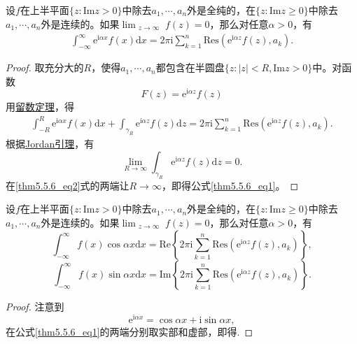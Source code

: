 \documentclass[../../main.tex]{subfiles}%
\begin{document}
\begin{theorem}\label{theorem:定理5.5.6}
设$f$在上半平面$\{ z: \mathrm{Im} z > 0 \}$中除去$a_1, \cdots, a_n$外是全纯的，在$\{ z: \mathrm{Im} z \geqslant 0 \}$中除去$a_1, \cdots, a_n$外是连续的。如果$\lim_{\substack{z \to \infty}} f(z) = 0$，那么对任意$\alpha > 0$，有
\begin{align}
\int_{-\infty}^{\infty} \mathrm{e}^{\mathrm{i}\alpha x} f(x) \mathrm{d}x = 2\pi \mathrm{i} \sum_{k=1}^{n} \mathrm{Res}(\mathrm{e}^{\mathrm{i}\alpha z} f(z), a_k). \label{thm5.5.6_eq1}
\end{align}
\end{theorem}
\begin{proof}
取充分大的$R$，使得$a_1, \cdots, a_n$都包含在半圆盘$\{ z: |z| < R, \mathrm{Im} z > 0 \}$中。对函数
\[
F(z) = \mathrm{e}^{\mathrm{i}\alpha z} f(z)
\]
用\hyperref[theorem:留数定理(残数定理)-定理5.4.9]{留数定理}，得
\begin{align}
\int_{-R}^{R} \mathrm{e}^{\mathrm{i}\alpha x} f(x) \mathrm{d}x + \int_{\gamma_R} \mathrm{e}^{\mathrm{i}\alpha z} f(z) \mathrm{d}z = 2\pi \mathrm{i} \sum_{k=1}^{n} \mathrm{Res}(\mathrm{e}^{\mathrm{i}\alpha z} f(z), a_k). \label{thm5.5.6_eq2}
\end{align}
根据\hyperref[lemma:Jordan引理]{Jordan引理}，有
\[
\lim_{R \to \infty} \int_{\gamma_R} \mathrm{e}^{\mathrm{i}\alpha z} f(z) \mathrm{d}z = 0.
\]
在\eqref{thm5.5.6_eq2}式的两端让$R \to \infty$，即得公式\eqref{thm5.5.6_eq1}。
\end{proof}

\begin{corollary}\label{corollary:推论5.5.7}
设$f$在上半平面$\{ z: \mathrm{Im} z > 0 \}$中除去$a_1, \cdots, a_n$外是全纯的，在$\{ z: \mathrm{Im} z \geqslant 0 \}$中除去$a_1, \cdots, a_n$外是连续的。如果$\lim_{\substack{z \to \infty}} f(z) = 0$，那么对任意$\alpha > 0$，有
\[
\int_{-\infty}^{\infty} f(x) \cos\alpha x \mathrm{d}x = \mathrm{Re} \left\{ 2\pi \mathrm{i} \sum_{k=1}^{n} \mathrm{Res}(\mathrm{e}^{\mathrm{i}\alpha z} f(z), a_k) \right\},
\]
\[
\int_{-\infty}^{\infty} f(x) \sin\alpha x \mathrm{d}x = \mathrm{Im} \left\{ 2\pi \mathrm{i} \sum_{k=1}^{n} \mathrm{Res}(\mathrm{e}^{\mathrm{i}\alpha z} f(z), a_k) \right\}.
\]
\end{corollary}
\begin{proof}
注意到
\[
\mathrm{e}^{\mathrm{i}\alpha x} = \cos\alpha x + \mathrm{i}\sin\alpha x,
\]
在公式\eqref{thm5.5.6_eq1}的两端分别取实部和虚部，即得.
\end{proof}
\end{document}
